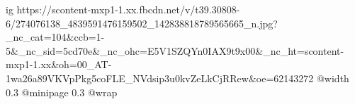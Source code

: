  
 
 
 
 

\ifcmt
  ig https://scontent-mxp1-1.xx.fbcdn.net/v/t39.30808-6/274076138_4839591476159502_142838818789565665_n.jpg?_nc_cat=104&ccb=1-5&_nc_sid=5cd70e&_nc_ohc=E5V1SZQYn0IAX9t9x00&_nc_ht=scontent-mxp1-1.xx&oh=00_AT-1wa26a89VKVpPkg5coFLE_NVdsip3u0kvZeLkCjRRew&oe=62143272
  @width 0.3
  @minipage 0.3
  @wrap \parpic[r]
\fi
